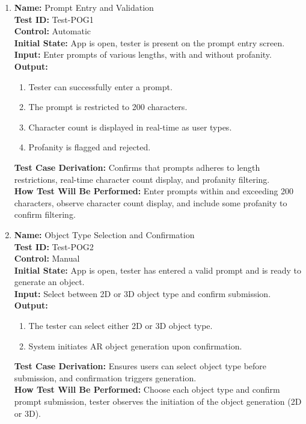 \documentclass[12pt, titlepage]{article}
\begin{document}
\begin{enumerate}

  \item \textbf{Name:} Prompt Entry and Validation \label{itm:Test-POG1} \\
        \textbf{Test ID:} Test-POG1 \\
        \textbf{Control:} Automatic \\
        \textbf{Initial State:} App is open, tester is present on the prompt entry screen. \\
        \textbf{Input:} Enter prompts of various lengths, with and without profanity. \\
        \textbf{Output:}
        \begin{enumerate}
          \item Tester can successfully enter a prompt.
          \item The prompt is restricted to 200 characters.
          \item Character count is displayed in real-time as user types.
          \item Profanity is flagged and rejected.
        \end{enumerate}
        \textbf{Test Case Derivation:} Confirms that prompts adheres to length restrictions, real-time character count display, and profanity filtering. \\
        \textbf{How Test Will Be Performed:} Enter prompts within and exceeding 200 characters, observe character count display, and include some profanity to confirm filtering. \\

  \item \textbf{Name:} Object Type Selection and Confirmation \label{itm:Test-POG2} \\
        \textbf{Test ID:} Test-POG2 \\
        \textbf{Control:} Manual \\
        \textbf{Initial State:} App is open, tester has entered a valid prompt and is ready to generate an object. \\
        \textbf{Input:} Select between 2D or 3D object type and confirm submission. \\
        \textbf{Output:}
        \begin{enumerate}
          \item The tester can select either 2D or 3D object type.
          \item System initiates AR object generation upon confirmation.
        \end{enumerate}
        \textbf{Test Case Derivation:} Ensures users can select object type before submission, and confirmation triggers generation. \\
        \textbf{How Test Will Be Performed:} Choose each object type and confirm prompt submission, tester observes the initiation of the object generation (2D or 3D). \\


\end{enumerate}
\end{document}
